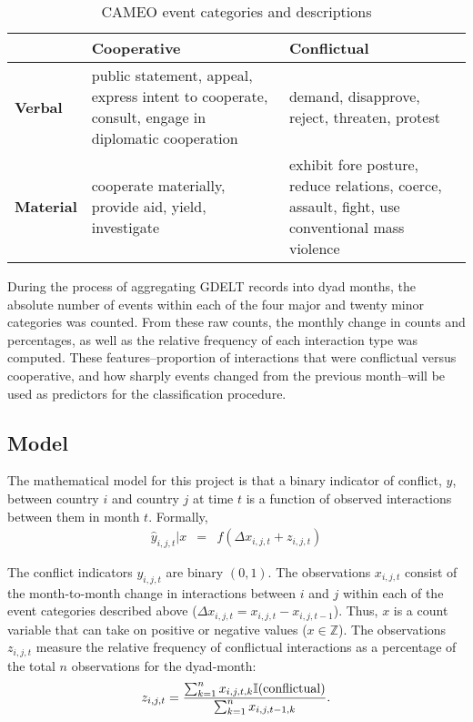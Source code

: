 \documentclass[12pt,letterpaper]{article}
\begin{document}
\begin{table}[t]
\caption{CAMEO event categories and descriptions}
\label{cameo}
\begin{center}
\begin{tabular}{lp{2in}p{2in}}
& \textbf{Cooperative} & \textbf{Conflictual} \\
\midrule
\textbf{Verbal} & public statement, appeal, express intent to cooperate, consult, engage in diplomatic cooperation & demand, disapprove, reject, threaten, protest \\
\textbf{Material} & cooperate materially, provide aid, yield, investigate & exhibit fore posture, reduce relations, coerce, assault, fight, use conventional mass violence
\end{tabular}
\end{center}
\end{table}

During the process of aggregating GDELT records into dyad months, the absolute number of events within each of the four major and twenty minor categories was counted. From these raw counts, the monthly change in counts and percentages, as well as the relative frequency of each interaction type was computed. These features--proportion of interactions that were conflictual versus cooperative, and how sharply events changed from the previous month--will be used as predictors for the classification procedure. 

\subsection{Model}




The mathematical model for this project is that a binary indicator of conflict, $y$, between country $i$ and country $j$ at time $t$ is a function of observed interactions between them in month $t$. Formally, 
\begin{eqnarray*}
\hat{y}_{i,j,t}|x &=& f(\Delta x_{i,j,t} + z_{i,j,t})
\end{eqnarray*}

The conflict indicators $y_{i,j,t}$ are binary $(0,1)$. The observations $x_{i,j,t}$ consist of the month-to-month change in interactions between $i$ and $j$ within each of the event categories described above ($\Delta x_{i,j,t} = x_{i,j,t} - x_{i,j,t-1}$). Thus, $x$ is a count variable that can take on positive or negative values ($x \in \mathbb{Z}$). The observations $z_{i,j,t}$ measure the relative frequency of conflictual interactions as a percentage of the total $n$ observations for the dyad-month: 
\begin{eqnarray*}
z_{i,j,t} = {\sum_{k=1}^n x_{i,j,t,k} \mathbb{I}(\text{conflictual})  \over \sum_{k=1}^n x_{i,j,t-1,k} }.
\end{eqnarray*}
\end{document}
